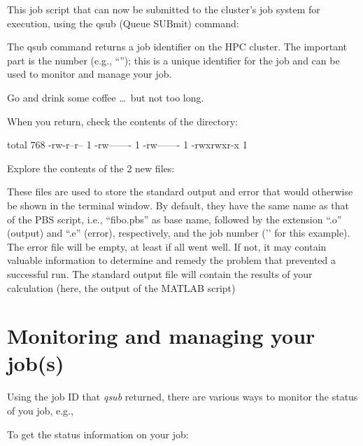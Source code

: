 This job script that can now be submitted to the cluster's job system for
execution, using the qsub (Queue SUBmit) command:

\begin{prompt}
\end{prompt}

The qsub command returns a job identifier on the HPC cluster. The important
part is the number (e.g., ``\jobnumber''); this is a unique identifier for the job
and can be used to monitor and manage your job.

Go and drink some coffee \dots\ but not too long.

When you return, check the contents of the directory:

\begin{prompt}
total 768
-rw-r--r-- 1 %
-rw------- 1 %
-rw------- 1 %
-rwxrwxr-x 1 %
\end{prompt}

Explore the contents of the 2 new files:

\begin{prompt}
\end{prompt}

These files are used to store the standard output and error that would
otherwise be shown in the terminal window. By default, they have the same name
as that of the PBS script, i.e., ``fibo.pbs'' as base name, followed by the
extension ``.o'' (output) and ``.e'' (error), respectively, and the job number
('\jobnumber' for this example). The error file will be empty, at least if all went
well. If not, it may contain valuable information to determine and remedy the
problem that prevented a successful run. The standard output file will contain
the results of your calculation (here, the output of the MATLAB script)

\section{Monitoring and managing your job(s)}

Using the job ID that \textit{qsub} returned, there are various ways to monitor
the status of you job, e.g.,

To get the status information on your job:

